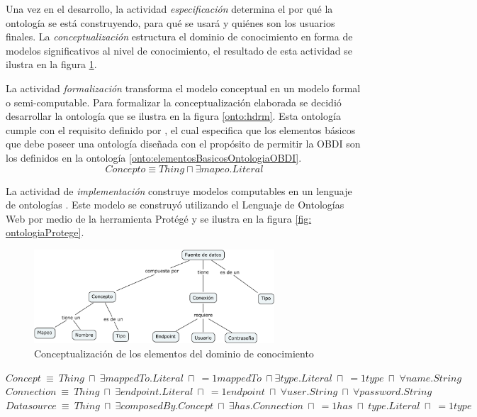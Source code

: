 Una vez en el desarrollo, la actividad \textit{especificación} determina el por qué la ontología se está construyendo, para qué se usará y quiénes son los usuarios finales. La \textit{conceptualización} estructura el dominio de conocimiento en forma de modelos significativos al nivel de conocimiento, el resultado de esta actividad se ilustra en la figura \ref{fig: mapaConceptual}. 

La actividad \textit{formalización} transforma el modelo conceptual en un modelo formal o semi-computable. Para formalizar la conceptualización elaborada se decidió desarrollar la ontología que se ilustra en la figura \ref{onto:hdrm}. Esta ontología cumple con el requisito definido por \cite{Calvanese2017}, el cual especifica que los elementos básicos que debe poseer una ontología diseñada con el propósito de permitir la OBDI son los definidos en la ontología \ref{onto:elementosBasicosOntologiaOBDI}.\\

\begin{equation}
Concepto \equiv Thing \sqcap \exists mapeo.Literal
\label{onto:elementosBasicosOntologiaOBDI}
\end{equation}

La actividad de \textit{implementación} construye modelos computables en un lenguaje de ontologías \citep{Gomez-Perez:2007:OEE:1199560}. Este modelo se construyó utilizando el Lenguaje de Ontologías Web por medio de la herramienta Protégé y se ilustra en la figura \ref{fig: ontologiaProtege}.

\begin{figure}
\begin{center}
	\includegraphics[width=0.8\textwidth]{img/mapaConceptual.png}
\end{center}
\caption{Conceptualización de los elementos del dominio de conocimiento}
\label{fig: mapaConceptual}
\end{figure}

\begin{minipage}{\textwidth}
$Concept \ \equiv \ Thing \ \sqcap \ \exists  mappedTo.Literal \ \sqcap \ =1 mappedTo \ \sqcap \exists  type.Literal \ \sqcap \ =1 type \ \sqcap \ \forall name.String$ \\
$Connection \ \equiv \ Thing \ \sqcap \ \exists endpoint.Literal \ \sqcap \ =1 endpoint \ \sqcap \ \forall user.String \ \sqcap \ \forall password.String $ \\
$Datasource \ \equiv \ Thing \ \sqcap \ \exists composedBy.Concept \ \sqcap \ \exists has.Connection \ \sqcap \ =1 has \ \sqcap \ type.Literal \ \sqcap \ =1 type$ \\
\label{onto:hdrm}
\end{minipage}

